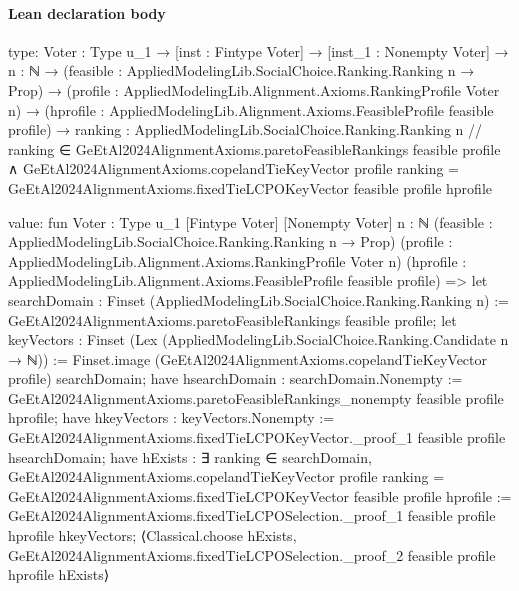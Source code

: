 \documentclass[10pt]{article}
\begin{document}
\paragraph{Lean declaration body}
\begin{ReviewVerbatim}
type:
{Voter : Type u_1} →
  [inst : Fintype Voter] →
    [inst_1 : Nonempty Voter] →
      {n : ℕ} →
        (feasible : AppliedModelingLib.SocialChoice.Ranking.Ranking n → Prop) →
          (profile : AppliedModelingLib.Alignment.Axioms.RankingProfile Voter n) →
            (hprofile : AppliedModelingLib.Alignment.Axioms.FeasibleProfile feasible profile) →
              { ranking : AppliedModelingLib.SocialChoice.Ranking.Ranking n //
                ranking ∈ GeEtAl2024AlignmentAxioms.paretoFeasibleRankings feasible profile ∧
                  GeEtAl2024AlignmentAxioms.copelandTieKeyVector profile ranking =
                    GeEtAl2024AlignmentAxioms.fixedTieLCPOKeyVector feasible profile hprofile }

value:
fun {Voter : Type u_1} [Fintype Voter] [Nonempty Voter] {n : ℕ}
    (feasible : AppliedModelingLib.SocialChoice.Ranking.Ranking n → Prop)
    (profile : AppliedModelingLib.Alignment.Axioms.RankingProfile Voter n)
    (hprofile : AppliedModelingLib.Alignment.Axioms.FeasibleProfile feasible profile) =>
  let searchDomain : Finset (AppliedModelingLib.SocialChoice.Ranking.Ranking n) :=
    GeEtAl2024AlignmentAxioms.paretoFeasibleRankings feasible profile;
  let keyVectors : Finset (Lex (AppliedModelingLib.SocialChoice.Ranking.Candidate n → ℕ)) :=
    Finset.image (GeEtAl2024AlignmentAxioms.copelandTieKeyVector profile) searchDomain;
  have hsearchDomain : searchDomain.Nonempty :=
    GeEtAl2024AlignmentAxioms.paretoFeasibleRankings_nonempty feasible profile hprofile;
  have hkeyVectors : keyVectors.Nonempty :=
    GeEtAl2024AlignmentAxioms.fixedTieLCPOKeyVector._proof_1 feasible profile hsearchDomain;
  have hExists :
    ∃ ranking ∈ searchDomain,
      GeEtAl2024AlignmentAxioms.copelandTieKeyVector profile ranking =
        GeEtAl2024AlignmentAxioms.fixedTieLCPOKeyVector feasible profile hprofile :=
    GeEtAl2024AlignmentAxioms.fixedTieLCPOSelection._proof_1 feasible profile hprofile hkeyVectors;
  ⟨Classical.choose hExists, GeEtAl2024AlignmentAxioms.fixedTieLCPOSelection._proof_2 feasible profile hprofile hExists⟩
\end{ReviewVerbatim}
\end{document}
